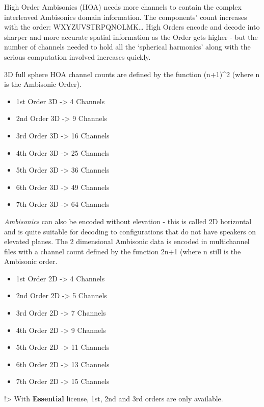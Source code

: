 \documentclass[
  letterpaper,
  DIV=11,
  numbers=noendperiod]{scrreport}
\providecommand{\tightlist}{%
  \setlength{\itemsep}{0pt}\setlength{\parskip}{0pt}}\usepackage{longtable,booktabs,array}
\begin{document}
High Order Ambisonics (HOA) needs more channels to contain the complex
interleaved Ambisonics domain information. The components' count
increases with the order: WXYZUVSTRPQNOLMK\ldots{} High Orders encode
and decode into sharper and more accurate spatial information as the
Order gets higher - but the number of channels needed to hold all the
`spherical harmonics' along with the serious computation involved
increases quickly.

3D full sphere HOA channel counts are defined by the function (n+1)\^{}2
(where n is the Ambisonic Order).

\begin{itemize}
\tightlist
\item
  1st Order 3D -\textgreater{} 4 Channels
\item
  2nd Order 3D -\textgreater{} 9 Channels
\item
  3rd Order 3D -\textgreater{} 16 Channels
\item
  4th Order 3D -\textgreater{} 25 Channels
\item
  5th Order 3D -\textgreater{} 36 Channels
\item
  6th Order 3D -\textgreater{} 49 Channels
\item
  7th Order 3D -\textgreater{} 64 Channels
\end{itemize}

\emph{Ambisonics} can also be encoded without elevation - this is called
2D horizontal and is quite suitable for decoding to configurations that
do not have speakers on elevated planes. The 2 dimensional Ambisonic
data is encoded in multichannel files with a channel count defined by
the function 2n+1 (where n still is the Ambisonic order.

\begin{itemize}
\tightlist
\item
  1st Order 2D -\textgreater{} 4 Channels
\item
  2nd Order 2D -\textgreater{} 5 Channels
\item
  3rd Order 2D -\textgreater{} 7 Channels
\item
  4th Order 2D -\textgreater{} 9 Channels
\item
  5th Order 2D -\textgreater{} 11 Channels
\item
  6th Order 2D -\textgreater{} 13 Channels
\item
  7th Order 2D -\textgreater{} 15 Channels
\end{itemize}

!\textgreater{} With \textbf{Essential} license, 1st, 2nd and 3rd orders
are only available.
\end{document}
